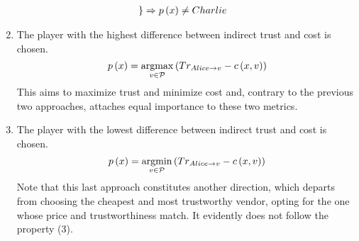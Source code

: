 \begin{enumerate}
\begin{align*}
\begin{rcases}
      \end{rcases}
      & \Rightarrow p\left(x\right) \neq Charlie
    \end{align*}
    \item The player with the highest difference between indirect trust and cost is
    chosen.
    \begin{equation*}
      p\left(x\right) = \operatorname*{argmax}\limits_{v \in \mathcal{P}}\left(Tr_{Alice \rightarrow v} -
      c\left(x, v\right)\right)
    \end{equation*}
    This aims to maximize trust and minimize cost and, contrary to the previous two
    approaches, attaches equal importance to these two metrics.
    \item The player with the lowest difference between indirect trust and cost is chosen.
    \begin{equation*}
      p\left(x\right) = \operatorname*{argmin}\limits_{v \in \mathcal{P}}\left(Tr_{Alice \rightarrow v} -
      c\left(x, v\right)\right)
    \end{equation*}
    Note that this last approach constitutes another direction, which departs from
    choosing the cheapest and most trustworthy vendor, opting for the one whose price and
    trustworthiness match. It evidently does not follow the property (3).
  \end{enumerate}
